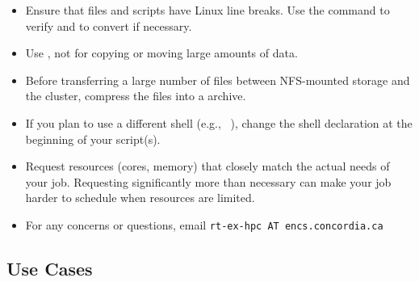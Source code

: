 \documentclass{easychair}
\begin{document}
\begin{itemize}
	\item Ensure that files and scripts have Linux line breaks.
	Use the  command to verify and  to convert if necessary.

	\item Use , not  for copying or moving large amounts of data.
	
	\item Before transferring a large number of files between NFS-mounted storage and 
	the cluster, compress the files into a  archive.

	\item If you plan to use a different shell (e.g., ~\cite{aosa-book-vol1-bash}), 
	change the shell declaration at the beginning of your script(s).

	\item Request resources (cores, memory) that closely match the actual needs of your job.
	Requesting significantly more than necessary can make your job harder to schedule when resources are limited.

	\item For any concerns or questions, email \texttt{rt-ex-hpc AT encs.concordia.ca}
\end{itemize}

\subsection{Use Cases}
\label{sect:cases}
\end{document}
